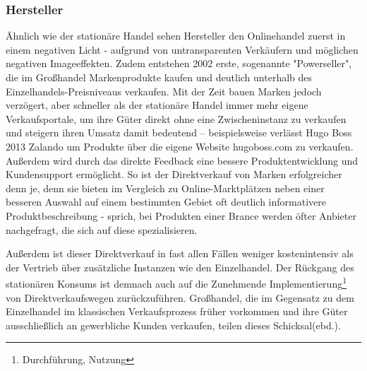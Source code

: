 \begin{folding} \subsubsection{Hersteller}

Ähnlich wie der stationäre Handel sehen Hersteller den Onlinehandel zuerst in einem negativen Licht - aufgrund von untransparenten Verkäufern und möglichen negativen Imageeffekten\cite[S. 20]{Graf}. Zudem entstehen 2002 erste, sogenannte "Powerseller", die im Großhandel Markenprodukte kaufen und deutlich unterhalb des Einzelhandels-Preisniveaus verkaufen\cite[S. 26]{Graf}. Mit der Zeit bauen Marken jedoch verzögert, aber schneller als der stationäre Handel immer mehr eigene Verkaufsportale, um ihre Güter direkt ohne eine Zwischeninstanz zu verkaufen und steigern ihren Umsatz damit bedeutend – beispielsweise verlässt Hugo Boss 2013 Zalando um Produkte über die eigene Website hugoboss.com zu verkaufen\cite[S. 48f]{Graf}. Außerdem wird durch das direkte Feedback eine bessere Produktentwicklung und Kundensupport ermöglicht\cite[S. 39]{Graf}. So ist der Direktverkauf von Marken erfolgreicher denn je, denn sie bieten im Vergleich zu Online-Marktplätzen neben einer besseren Auswahl auf einem bestimmten Gebiet oft deutlich informativere Produktbeschreibung - sprich, bei Produkten einer Brance werden öfter Anbieter nachgefragt, die sich auf diese spezialisieren\cite[S. 18f]{evilcom}.

Außerdem ist dieser Direktverkauf in fast allen Fällen weniger kostenintensiv als der Vertrieb über zusätzliche Instanzen wie den Einzelhandel. Der Rückgang des stationären Konsums ist demnach auch auf die Zunehmende Implementierung\footnote{Durchführung, Nutzung} von Direktverkaufswegen zurückzuführen. Großhandel, die im Gegensatz zu dem Einzelhandel im klassischen Verkaufsprozess früher vorkommen und ihre Güter ausschließlich an gewerbliche Kunden verkaufen, teilen dieses Schicksal(ebd.).

\end{folding}

